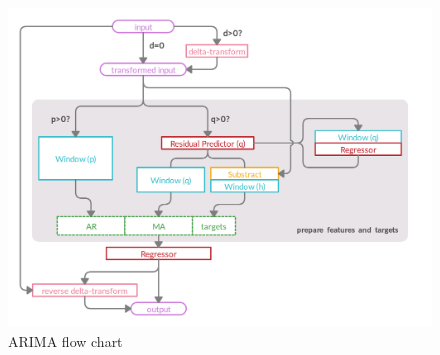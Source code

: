 \documentclass{article}
\begin{document}
\begin{figure}
  \centering
  \includegraphics[scale=0.2]{figures/summary}
  \caption{ARIMA flow chart}
  \label{fig:fig4}
\end{figure}
\end{document}
